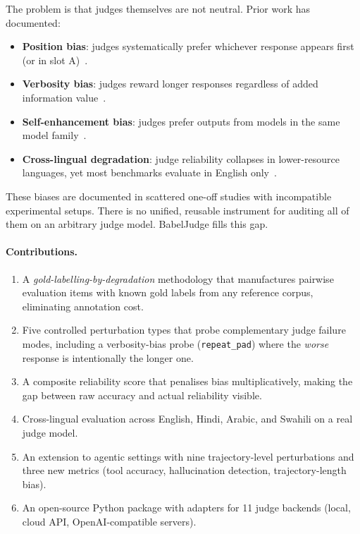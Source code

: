 \documentclass[11pt]{article}
\begin{document}
The problem is that judges themselves are not neutral. Prior work has documented:
\begin{itemize}[leftmargin=*,itemsep=2pt]
    \item \textbf{Position bias}: judges systematically prefer whichever response appears first (or in slot A)~\cite{ko2020look,wang2023large}.
    \item \textbf{Verbosity bias}: judges reward longer responses regardless of added information value~\cite{singhal2023long,saito2023verbosity}.
    \item \textbf{Self-enhancement bias}: judges prefer outputs from models in the same model family~\cite{panickssery2024llm}.
    \item \textbf{Cross-lingual degradation}: judge reliability collapses in lower-resource languages, yet most benchmarks evaluate in English only~\cite{hada2024metal,ahuja2023mega}.
\end{itemize}

These biases are documented in scattered one-off studies with incompatible experimental setups. There is no unified, reusable instrument for auditing all of them on an arbitrary judge model. BabelJudge fills this gap.

\paragraph{Contributions.}
\begin{enumerate}[leftmargin=*,itemsep=2pt]
    \item A \emph{gold-labelling-by-degradation} methodology that manufactures pairwise evaluation items with known gold labels from any reference corpus, eliminating annotation cost.
    \item Five controlled perturbation types that probe complementary judge failure modes, including a verbosity-bias probe (\texttt{repeat\_pad}) where the \emph{worse} response is intentionally the longer one.
    \item A composite reliability score that penalises bias multiplicatively, making the gap between raw accuracy and actual reliability visible.
    \item Cross-lingual evaluation across English, Hindi, Arabic, and Swahili on a real judge model.
    \item An extension to agentic settings with nine trajectory-level perturbations and three new metrics (tool accuracy, hallucination detection, trajectory-length bias).
    \item An open-source Python package with adapters for 11 judge backends (local, cloud API, OpenAI-compatible servers).
\end{enumerate}
\end{document}
